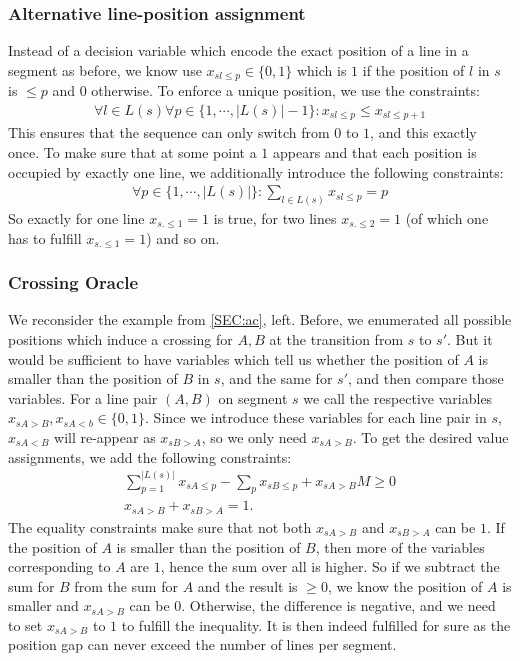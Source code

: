 \documentclass{llncs}
\begin{document}
\subsubsection{Alternative line-position assignment}
Instead of a decision variable which encode the exact position of a line in a segment as before, we know use $x_{sl\leq p} \in \{0,1\}$ which is $1$ if the position of $l$ in $s$ is $\leq p$ and $0$ otherwise. To enforce a unique position, we use the constraints:
\begin{align}
	\forall l \in L(s) \forall p \in \{1, \cdots, |L(s)|-1\}: x_{sl\leq p} \leq x_{sl\leq p+1} \label{EQ:up_constr}
\end{align}
This ensures that the sequence can only switch from $0$ to $1$, and this exactly once. To make sure that at some point a $1$ appears and that each position is occupied by exactly one line, we additionally introduce the following constraints:
\begin{align}
	\forall p \in \{1, \cdots, |L(s)|\}: \sum_{l \in L(s)} x_{sl\leq p} = p \label{EQ:01_constr}
\end{align}
So exactly for  one line $x_{s.\leq 1} =1$ is true, for two lines $x_{s.\leq 2} = 1$ (of which one has to fulfill $x_{s.\leq 1} =1$) and so on.

\subsubsection{Crossing Oracle}
We reconsider the example from \ref{SEC:ac}, left. Before, we enumerated all possible positions which induce a crossing for $A, B$ at the transition from $s$ to $s'$. But it would be sufficient to have variables which tell us whether the position of $A$ is smaller than the position of $B$ in $s$, and the same for $s'$, and then compare those variables. For a line pair $(A,B)$ on segment $s$ we call the respective variables $x_{sA>B}, x_{sA<b} \in \{0, 1\}$. Since we introduce these variables for each line pair in $s$, $x_{sA<B}$ will re-appear as $x_{sB>A}$, so we only need $x_{sA>B}$. To get the desired value assignments, we add the following constraints:
\begin{gather}
	\sum_{p=1}^{|L(s)|} x_{sA\leq p} - \sum_{p} x_{sB\leq p} + x_{sA>B} M \geq 0 \\
	x_{sA>B} + x_{sB>A}=1.
\end{gather}
The equality constraints make sure that not both $x_{sA>B}$ and $x_{sB>A}$ can be $1$. If the position of $A$ is smaller than the position of $B$, then more of the variables corresponding to $A$ are $1$, hence the sum over all is higher. So if we subtract the sum for $B$ from the sum for $A$ and the result is $\geq 0$, we know the position of $A$ is  smaller and $x_{sA>B}$ can be $0$. Otherwise, the difference is negative, and we need to set $x_{sA>B}$ to $1$ to fulfill the inequality. It is then indeed fulfilled for sure as the position gap can never exceed the number of lines per segment.
\end{document}
